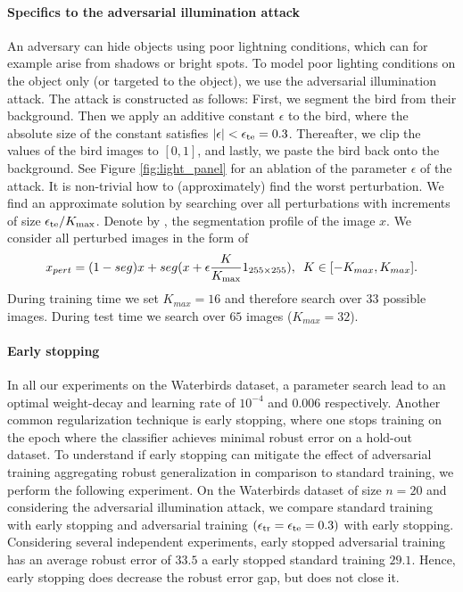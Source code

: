 \paragraph{Specifics to the adversarial illumination attack} 
An adversary can hide objects using poor lightning conditions, which can for example arise from shadows or bright spots. To model poor lighting conditions on the object only (or targeted to the object), we use the adversarial illumination attack. 
The attack is constructed as follows: First, we segment the bird from their background. Then we apply an additive constant $\epsilon$ to the bird, where the absolute size of the constant satisfies $|\epsilon| < \epsilon_{\text{te}} = 0.3$. Thereafter, we clip the values of the bird images to $[0, 1]$, and lastly, we paste the bird back onto the background. See Figure \ref{fig:light_panel} for an ablation of the parameter $\epsilon$ of the attack. It is non-trivial how to (approximately) find the worst perturbation. We find an approximate solution by searching over all perturbations with increments of size $\epsilon_{\text{te}}/K_{\text{max}}$. Denote by \segmentation, the segmentation profile of the image $x$. We consider all perturbed images in the form of
\begin{equation*}
x_{pert} = (1-seg) x + seg (x + \epsilon \frac{K}{K_{\text{max}}}  1_{255 \times 255}), \hspace{0.5em} K \in [-K_{max}, K_{max}].
\end{equation*} 
During training time we set $K_{max} = 16$ and therefore search over $33$ possible images. During test time we search over $65$ images ($K_{max} = 32$).

\paragraph{Early stopping} In all our experiments on the Waterbirds dataset, a parameter search lead to an optimal weight-decay and learning rate of $10^{-4}$ and $0.006$ respectively. Another common regularization technique is early stopping, where one stops training on the epoch where the classifier achieves minimal robust error on a hold-out dataset. To understand if early stopping can mitigate the effect of adversarial training aggregating robust generalization in comparison to standard training, we perform the following experiment. On the Waterbirds dataset of size $n = 20$ and considering the adversarial illumination attack, we compare standard training with early stopping and adversarial training $(\epsilon_{\text{tr}} = \epsilon_{\text{te}} = 0.3)$ with early stopping. Considering several independent experiments, early stopped adversarial training has an average robust error of $33.5$ a early stopped standard training $29.1$. Hence, early stopping does decrease the robust error gap, but does not close it. 

